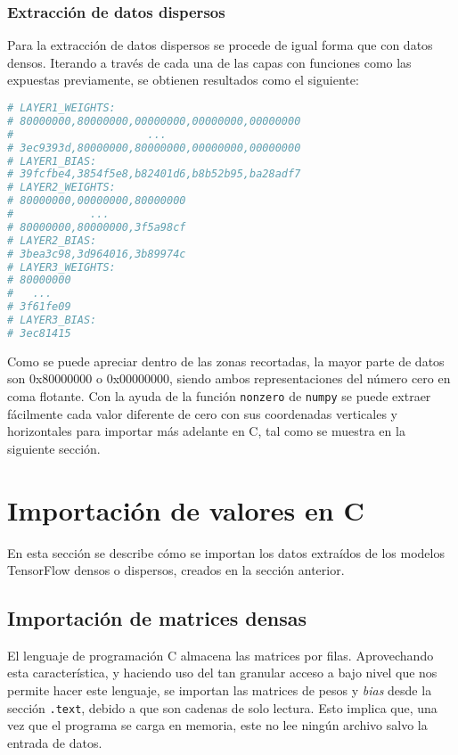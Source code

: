 \subsubsection{Extracción de datos dispersos}
\label{sssec:extraccion_datos_dispersos}
Para la extracción de datos dispersos se procede de igual forma que con datos densos. Iterando a través de cada una de las capas con funciones como las expuestas previamente, se obtienen resultados como el siguiente:\medskip
\begin{lstlisting}[language=Python]
# LAYER1_WEIGHTS:
# 80000000,80000000,00000000,00000000,00000000
#                     ...
# 3ec9393d,80000000,80000000,00000000,00000000
# LAYER1_BIAS:
# 39fcfbe4,3854f5e8,b82401d6,b8b52b95,ba28adf7
# LAYER2_WEIGHTS:
# 80000000,00000000,80000000
#            ...
# 80000000,80000000,3f5a98cf
# LAYER2_BIAS:
# 3bea3c98,3d964016,3b89974c
# LAYER3_WEIGHTS:
# 80000000
#   ...
# 3f61fe09
# LAYER3_BIAS:
# 3ec81415    
\end{lstlisting}

Como se puede apreciar dentro de las zonas recortadas, la mayor parte de datos son 0x80000000 o 0x00000000, siendo ambos representaciones del número cero en coma flotante. Con la ayuda de la función \texttt{nonzero} de \texttt{numpy} se puede extraer fácilmente cada valor diferente de cero con sus coordenadas verticales y horizontales para importar más adelante en C, tal como se muestra en la siguiente sección.

\section{Importación de valores en C}
\label{sec:importacion_valores_c}
En esta sección se describe cómo se importan los datos extraídos de los modelos TensorFlow densos o dispersos, creados en la sección anterior.

\subsection{Importación de matrices densas}
\label{ssec:importacion_matrices_densas}
El lenguaje de programación C almacena las matrices por filas. Aprovechando esta característica, y haciendo uso del tan granular acceso a bajo nivel que nos permite hacer este lenguaje, se importan las matrices de pesos y \textit{bias} desde la sección \texttt{.text}, debido a que son cadenas de solo lectura. Esto implica que, una vez que el programa se carga en memoria, este no lee ningún archivo salvo la entrada de datos.

